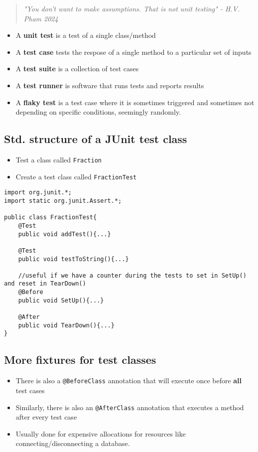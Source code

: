 \documentclass[12pt]{book}
\begin{document}
\begin{quote}
    \textit{"You don't want to make assumptions. That is not unit testing" - H.V. Pham 2024}
\end{quote}

\begin{itemize}
    \item A \textbf{unit test} is a test of a single class/method
    \item A \textbf{test case} tests the respose of a single method to a particular set of inputs
    \item A \textbf{test suite} is a collection of test cases
    \item A \textbf{test runner} is software that runs tests and reports results
    \item A \textbf{flaky test} is a test case where it is sometimes triggered and sometimes not depending on specific conditions, seemingly randomly.
\end{itemize}

\newpage
\subsection*{Std. structure of a JUnit test class}

\begin{itemize}
    \item Test a class called \texttt{Fraction}
    \item Create a test class called \texttt{FractionTest}
\end{itemize}

\begin{lstlisting}
import org.junit.*;
import static org.junit.Assert.*;

public class FractionTest{
    @Test
    public void addTest(){...}

    @Test
    public void testToString(){...}

    //useful if we have a counter during the tests to set in SetUp() and reset in TearDown()
    @Before
    public void SetUp(){...}

    @After
    public void TearDown(){...}
}
\end{lstlisting}


\subsection*{More fixtures for test classes}
\begin{itemize}
    \item There is also a \texttt{@BeforeClass} annotation that will execute once before \textbf{all} test cases
    \item Similarly, there is also an \texttt{@AfterClass} annotation that executes a method after every test case
    \item Usually done for expensive allocations for resources like connecting/disconnecting a database.
\end{itemize}
\end{document}
